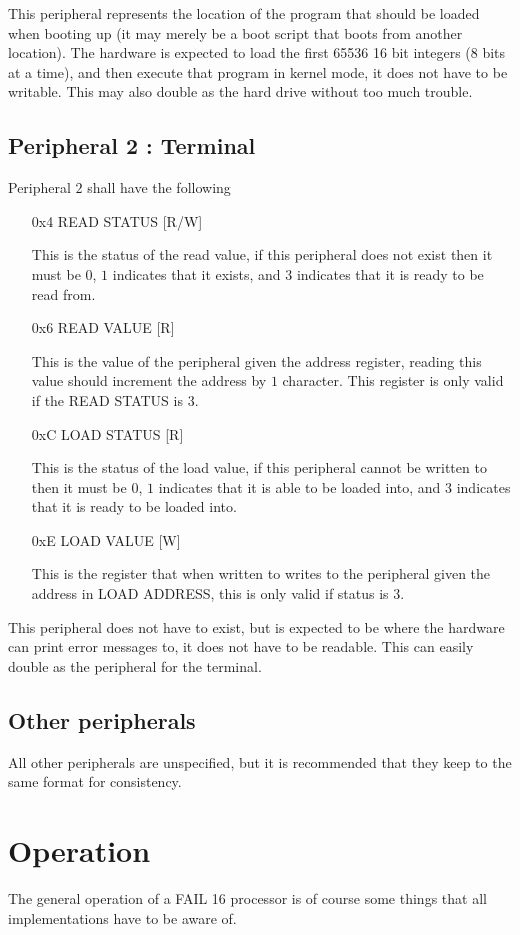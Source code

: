 \documentclass[12pt,letterpaper]{report}
\newcommand{\ronly}{[R]}
\newcommand{\wonly}{[W]}
\newcommand{\rw}{[R/W]}
\begin{document}
This peripheral represents the location of the program that should be loaded when booting up (it may merely be a boot script that boots from another location). The hardware is expected to load the first 65536 16 bit integers (8 bits at a time), and then execute that program in kernel mode, it does not have to be writable. This may also double as the hard drive without too much trouble.
\section{Peripheral 2 : Terminal}
\label{peripheral:Boot Output}
Peripheral $2$ shall have the following 
\begin{enumerate}
\item[0x4] READ STATUS \rw

This is the status of the read value, if this peripheral does not exist then it must be $0$, $1$ indicates that it exists, and $3$ indicates that it is ready to be read from.
\item[0x6] READ VALUE \ronly

This is the value of the peripheral given the address register, reading this value should increment the address by $1$ character. This register is only valid if the READ STATUS is $3$.
\item[0xC] LOAD STATUS \ronly

This is the status of the load value, if this peripheral cannot be written to then it must be $0$, $1$ indicates that it is able to be loaded into, and $3$ indicates that it is ready to be loaded into.
\item[0xE] LOAD VALUE \wonly

This is the register that when written to writes to the peripheral given the address in LOAD ADDRESS, this is only valid if status is $3$.
\end{enumerate}

This peripheral does not have to exist, but is expected to be where the hardware can print error messages to, it does not have to be readable. This can easily double as the peripheral for the terminal.
\section{Other peripherals}
All other peripherals are unspecified, but it is recommended that they keep to the same format for consistency.
\chapter{Operation}
The general operation of a FAIL 16 processor is of course some things that all implementations have to be aware of.
\end{document}
